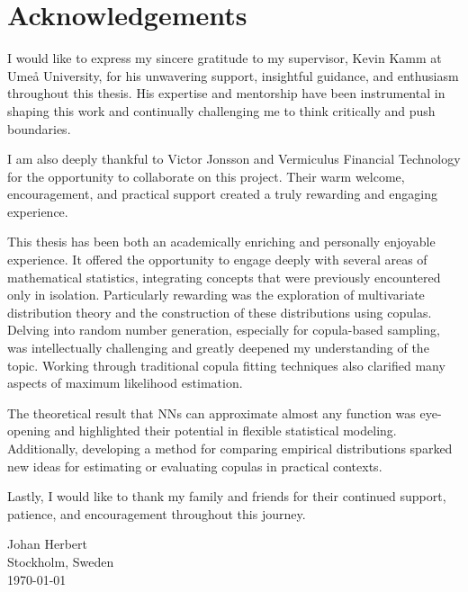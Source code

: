 \documentclass[%
a4paper,							
11pt,								
bibliography=totoc,						
abstracton=true					
]
{scrartcl}
\theoremstyle{plain}
\theoremstyle{definition}
\theoremstyle{remark}
\newcommand{\1}{\mathbbm{1}}
\begin{document}
\section*{Acknowledgements}
I would like to express my sincere gratitude to my supervisor, Kevin Kamm at Umeå University, for his unwavering support, insightful guidance, and enthusiasm throughout this thesis. His expertise and mentorship have been instrumental in shaping this work and continually challenging me to think critically and push boundaries.

I am also deeply thankful to Victor Jonsson and Vermiculus Financial Technology for the opportunity to collaborate on this project. Their warm welcome, encouragement, and practical support created a truly rewarding and engaging experience.

This thesis has been both an academically enriching and personally enjoyable experience. It offered the opportunity to engage deeply with several areas of mathematical statistics, integrating concepts that were previously encountered only in isolation. Particularly rewarding was the exploration of multivariate distribution theory and the construction of these distributions using copulas. Delving into random number generation, especially for copula-based sampling, was intellectually challenging and greatly deepened my understanding of the topic. Working through traditional copula fitting techniques also clarified many aspects of maximum likelihood estimation.

The theoretical result that \gls{NN}s can approximate almost any function was eye-opening and highlighted their potential in flexible statistical modeling. Additionally, developing a method for comparing empirical distributions sparked new ideas for estimating or evaluating copulas in practical contexts.

Lastly, I would like to thank my family and friends for their continued support, patience, and encouragement throughout this journey.

Johan Herbert\\
Stockholm, Sweden\\
\today 

\newpage
\printglossary
\clearpage
\newpage
{\hypersetup{linkcolor=black}
\tableofcontents
}
\newpage
{}
\pagestyle{scrheadings}
\end{document}
